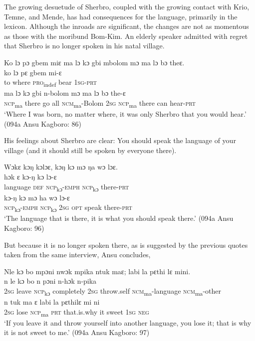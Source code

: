 The growing desuetude of Sherbro, coupled with the growing contact with Krio, Temne, and Mende, has had consequences for the language, primarily in the lexicon. Although the inroads are significant, the changes are not as momentous as those with the moribund Bom-Kim. An elderly speaker admitted with regret that Sherbro is no longer spoken in his natal village.


\ea %
\label{ex:5}
Ko lɔ pɔ gbem miɛ ma lɔ kɔ gbi mbolom mɔ ma lɔ bɔ theɛ.\\
\gll ko    lɔ      pɛ      gbem    mi-ɛ\\
to    where  \textsc{pro}\textsubscript{indef}  bear    \textsc{1sg-prt}\\
ma    lɔ    kɔ    gbi  n-bolom      mɔ  ma    lɔ    bɔ    the-ɛ\\
\textsc{ncp}\textsubscript{ma}    there  go    all    \textsc{ncm}\textsubscript{ma}{}-Bolom  \textsc{2sg}  \textsc{ncp}\textsubscript{ma}    there  can  hear-\textsc{prt}\\
\glt ‘Where I was born, no matter where, it was only Sherbro that you would hear.' (094a Ansu Kagboro: 86)
\z

His feelings about Sherbro are clear: You should speak the language of your village (and it should still be spoken by everyone there).

\ea %
\label{ex:6}
Wɔkɛ kɔŋ kɔlɔɛ, kɔŋ kɔ mɔ ŋa wɔ lɔɛ.\\
\gll hɔk      ɛ    kɔ-ŋ        kɔ      lɔ-ɛ\\
language  \textsc{def}  \textsc{ncp}\textsubscript{kɔ}{}-\textsc{emph}    \textsc{ncp}\textsubscript{kɔ}    there-\textsc{prt}\\
\gll kɔ-ŋ        kɔ      mɔ  ha      wɔ      lɔ-ɛ\\
\textsc{ncp}\textsubscript{kɔ}{}-\textsc{emph}    \textsc{ncp}\textsubscript{kɔ}    \textsc{2sg}  \textsc{opt}    speak    there-\textsc{prt}\\
\glt ‘The language that is there, it is what you should speak there.' (094a Ansu Kagboro: 96)
\z

But because it is no longer spoken there, as is suggested by the previous quotes taken from the same interview, Ansu concludes,


\ea%
\label{ex:7}
Nle kɔ bo mpɔni nwɔk mpika ntuk maɛ; labi la pɛthi lɛ mini.\\
\gll n    le    kɔ      bo        n    pɔni      n-hɔk          n-pika\\
\textsc{2sg}  leave  \textsc{ncp}\textsubscript{kɔ}    completely  \textsc{2sg}  throw.self  \textsc{ncm}\textsubscript{ma}{}-language  \textsc{ncm}\textsubscript{ma}{}-other\\
\gll n    tuk  ma    ɛ      labi        la  pɛthilɛ  mi    ni\\
\textsc{2sg}  lose  \textsc{ncp}\textsubscript{ma}    \textsc{prt}    that.is.why    it  sweet    \textsc{1sg}  \textsc{neg}\\
\glt ‘If you leave it and throw yourself into another language, you lose it; that is why it is not sweet to me.' (094a Ansu Kagboro: 97)
\z

